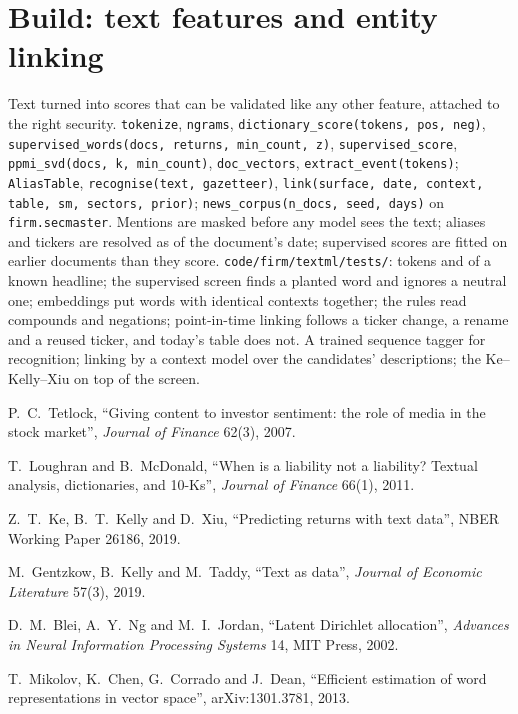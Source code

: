 \section{Build: text features and entity linking}\label{bld:ml:text-from-bag-of-words-to-embeddings:textml}

\begin{build}
 Text turned into scores that can be validated like any other feature, attached to the right security.
 \texttt{tokenize}, \texttt{ngrams}, \texttt{dictionary\_score(tokens, pos, neg)},
\texttt{supervised\_words(docs, returns, min\_count, z)}, \texttt{supervised\_score}, \texttt{ppmi\_svd(docs, k,
min\_count)}, \texttt{doc\_vectors}, \texttt{extract\_event(tokens)}; \texttt{AliasTable}, \texttt{recognise(text,
gazetteer)}, \texttt{link(surface, date, context, table, sm, sectors, prior)}; \texttt{news\_corpus(n\_docs, seed, days)}
on \texttt{firm.secmaster}.
 Mentions are masked before any model sees the text; aliases and tickers are resolved as of the document's
date; supervised scores are fitted on earlier documents than they score.
 \texttt{code/firm/textml/tests/}: tokens and  of a known headline; the supervised screen
finds a planted word and ignores a neutral one; embeddings put words with identical contexts together; the rules read
compounds and negations; point-in-time linking follows a ticker change, a rename and a reused ticker, and today's table
does not.
 A trained sequence tagger for recognition; linking by a context model over the candidates' descriptions;
the Ke--Kelly--Xiu  on top of the screen.
\end{build}

\begin{omsources}
\item P.~C.~Tetlock, ``Giving content to investor sentiment: the role of media in the stock market'', \emph{Journal of
Finance} 62(3), 2007.
\item T.~Loughran and B.~McDonald, ``When is a liability not a liability? Textual analysis, dictionaries, and 10-Ks'',
\emph{Journal of Finance} 66(1), 2011.
\item Z.~T.~Ke, B.~T.~Kelly and D.~Xiu, ``Predicting returns with text data'', NBER Working Paper 26186, 2019.
\item M.~Gentzkow, B.~Kelly and M.~Taddy, ``Text as data'', \emph{Journal of Economic Literature} 57(3), 2019.
\item D.~M.~Blei, A.~Y.~Ng and M.~I.~Jordan, ``Latent Dirichlet allocation'', \emph{Advances in Neural Information Processing
Systems} 14, MIT Press, 2002.
\item T.~Mikolov, K.~Chen, G.~Corrado and J.~Dean, ``Efficient estimation of word representations in vector space'',
arXiv:1301.3781, 2013.
\end{omsources}

